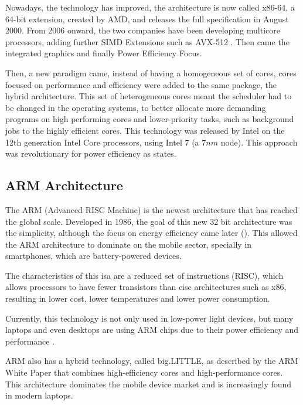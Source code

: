 Nowadays, the technology has improved, the architecture is now called x86-64, a 64-bit extension, created by AMD, and releases the full specification in August 2000. From 2006 onward, the two companies have been developing multicore processors, adding further \gls{SIMD} Extensions such as AVX-512 \cite{intel-avx512}. Then came the integrated graphics and finally Power Efficiency Focus. 

Then, a new paradigm came, instead of having a homogeneous set of cores, cores focused on performance and efficiency were added to the same package, the hybrid architecture. This set of heterogeneous cores meant the scheduler had to be changed in the operating systems, to better allocate more demanding programs on high performing cores and lower-priority tasks, such as background jobs to the highly efficient cores. This technology was released by Intel on the 12th generation Intel Core processors, using Intel 7 (a $7 nm$ node). This approach was revolutionary for power efficiency as \textcite{big-little} states.


\subsection{\gls{ARM} Architecture}
The \gls{ARM} (Advanced RISC Machine) is the newest architecture that has reached the global scale. Developed in 1986, the goal of this new 32 bit architecture was the simplicity, although the focus on energy efficiency came later (\textcite{arm:story}). This allowed the \gls{ARM} architecture to dominate on the mobile sector, specially in smartphones, which are battery-powered devices.

The characteristics of this \gls{isa} are a reduced set of instructions (\gls{RISC}), which  allows processors to have fewer transistors than \gls{cisc} architectures such as x86, resulting in lower cost, lower temperatures and lower power consumption.

Currently, this technology is not only used in low-power light devices, but many laptops and even desktops are using \gls{ARM} chips due to their power efficiency and performance \cite{arm:optimization-big.LITTLE}.

\gls{ARM} also has a hybrid technology, called big.LITTLE, as described by the \gls{ARM} White Paper \cite{arm:biglittle2013} that combines high-efficiency cores and high-performance cores. This architecture dominates the mobile device market and is increasingly found in modern laptops.





